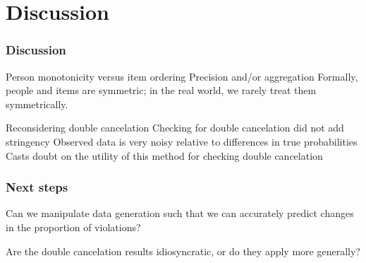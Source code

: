 \documentclass[10pt,serif,professionalfont]{beamer}
\begin{document}
\section{Discussion}

\begin{frame}
    \frametitle{Discussion}

    \begin{outline}
        \1 Person monotonicity versus item ordering
            \2 Precision and/or aggregation 
            \2 Formally, people and items are symmetric; in the real world, we rarely treat them symmetrically.  

        \vspace{0.25cm}

        \1 Reconsidering double cancelation
            \2 Checking for double cancelation did not add stringency
            \2 Observed data is very noisy relative to differences in true probabilities
            \2 Casts doubt on the utility of this method for checking double cancelation

    \end{outline}

\end{frame}

\begin{frame}
    \frametitle{Next steps}
    
    \begin{outline}
        \1 Can we manipulate data generation such that we can accurately predict changes in the proportion of violations?
        
        \vspace{0.25cm}
        
        \1 Are the double cancelation results idiosyncratic, or do they apply more generally?  
       
    \end{outline}

\end{frame}
\end{document}
